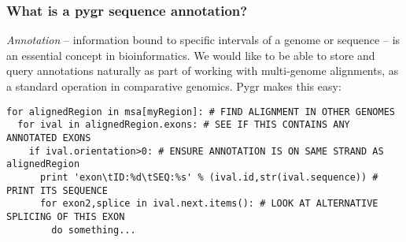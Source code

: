 \documentclass{howto}
\begin{document}
\subsubsection{What is a pygr sequence annotation?}
{\em Annotation} -- information bound to specific intervals of a genome
or sequence -- is an essential concept in bioinformatics.  We would like to
be able to store and query annotations naturally as part of working with
multi-genome alignments, as a standard operation in comparative genomics.
Pygr makes this easy:
\begin{verbatim}
for alignedRegion in msa[myRegion]: # FIND ALIGNMENT IN OTHER GENOMES
  for ival in alignedRegion.exons: # SEE IF THIS CONTAINS ANY ANNOTATED EXONS
    if ival.orientation>0: # ENSURE ANNOTATION IS ON SAME STRAND AS alignedRegion
      print 'exon\tID:%d\tSEQ:%s' % (ival.id,str(ival.sequence)) # PRINT ITS SEQUENCE
      for exon2,splice in ival.next.items(): # LOOK AT ALTERNATIVE SPLICING OF THIS EXON
        do something...
\end{verbatim}
\end{document}
